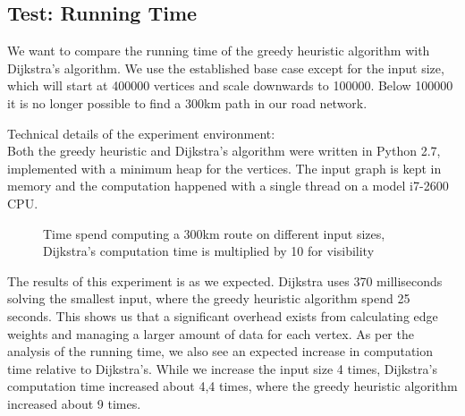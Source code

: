 \subsection{Test: Running Time}
We want to compare the running time of the greedy heuristic algorithm with Dijkstra's algorithm. We use the established base case except for the input size, which will start at 400000 vertices and scale downwards to 100000. Below 100000 it is no longer possible to find a 300km path in our road network.

Technical details of the experiment environment:\\
Both the greedy heuristic and Dijkstra's algorithm were written in Python 2.7, implemented with a minimum heap for the vertices. The input graph is kept in memory and the computation happened with a single thread on a model i7-2600 CPU.
\begin{figure}
\centering
{}
\caption{Time spend computing a 300km route on different input sizes, Dijkstra's computation time is multiplied by 10 for visibility} 
\label{fig:time_comp}
\end{figure}

The results of this experiment is as we expected. Dijkstra uses 370 milliseconds solving the smallest input, where the greedy heuristic algorithm spend 25 seconds. This shows us that a significant overhead exists from calculating edge weights and managing a larger amount of data for each vertex. As per the analysis of the running time, we also see an expected increase in computation time relative to Dijkstra's. While we increase the input size 4 times, Dijkstra's computation time increased about 4,4 times, where the greedy heuristic algorithm increased about 9 times.